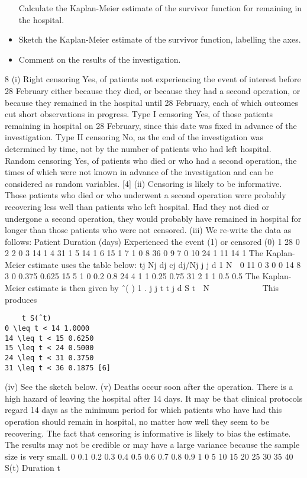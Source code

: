 \documentclass[a4paper,12pt]{article}
\begin{document}
\begin{itemize}
\ite[(iii)] Calculate the Kaplan-Meier estimate of the survivor function for remaining in
the hospital.
\item[(iv)] Sketch the Kaplan-Meier estimate of the survivor function, labelling the axes.

\item[(v)] Comment on the results of the investigation. 
\end{itemize}

\newpage
  8 (i) Right censoring
Yes, of patients not experiencing the event of interest before 28 February
either because they died, or because they had a second operation, or because they remained in the hospital until 28 February, each of which outcomes cut short observations in progress.
Type I censoring
Yes, of those patients remaining in hospital on 28 February, since this date
was fixed in advance of the investigation.
Type II censoring
No, as the end of the investigation was determined by time, not by the number of patients who had left hospital.
Random censoring
Yes, of patients who died or who had a second operation, the times of which
were not known in advance of the investigation and can be considered as
random variables. [4]
(ii) Censoring is likely to be informative.
Those patients who died or who underwent a second operation were
probably recovering less well than patients who left hospital.
Had they not died or undergone a second operation, they would probably
have remained in hospital for longer than those patients who were not
censored. 
(iii) We re-write the data as follows:
  Patient Duration (days) Experienced the event (1)
or censored (0)
1 28 0
2 2 0
3 14 1
4 31 1
5 14 1
6 15 1
7 1 0
8 36 0
9 7 0
10 24 1
11 14 1
The Kaplan-Meier estimate uses the table below:
  tj Nj dj cj dj/Nj j
j
d
1
N

0 11 0 3 0 0
14 8 3 0 0.375 0.625
15 5 1 0 0.2 0.8
24 4 1 1 0.25 0.75
31 2 1 1 0.5 0.5
The Kaplan-Meier estimate is then given by
ˆ( ) 1 . j
j
t t
j
d
S t
 N
 
    
 
This produces
\begin{verbatim}
    t S(ˆt)
0 \leq t < 14 1.0000
14 \leq t < 15 0.6250
15 \leq t < 24 0.5000
24 \leq t < 31 0.3750
31 \leq t < 36 0.1875 [6]
\end{verbatim}

(iv) See the sketch below.
\newpage
(v) Deaths occur soon after the operation.
There is a high hazard of leaving the hospital after 14 days.
It may be that clinical protocols regard 14 days as the minimum period for which patients who have had this operation should remain in hospital, no matter how well they seem to be recovering.
The fact that censoring is informative is likely to bias the estimate.
The results may not be credible or may have a large variance because the sample size is very small.
0
0.1
0.2
0.3
0.4
0.5
0.6
0.7
0.8
0.9
1
0 5 10 15 20 25 30 35 40
S(t)
Duration t
\end{document}
